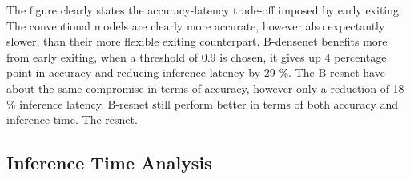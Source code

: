 The figure clearly states the accuracy-latency trade-off imposed by early exiting. The conventional models are clearly more accurate, however also expectantly slower, than their more flexible exiting counterpart. B-\gls{densenet} benefits more from early exiting, when a threshold of 0.9 is chosen, it gives up 4 percentage point in accuracy and reducing inference latency by 29 \%. The B-\gls{resnet} have about the same compromise in terms of accuracy, however only a reduction of 18 \% inference latency. B-\gls{resnet} still perform better in terms of both accuracy and inference time. The \gls{resnet}. 

  \begin{figure}
	\captionsetup[subfigure]{justification=centering}
	\centering
	\caption[]{}
\end{figure}

\subsection{Inference Time Analysis}

